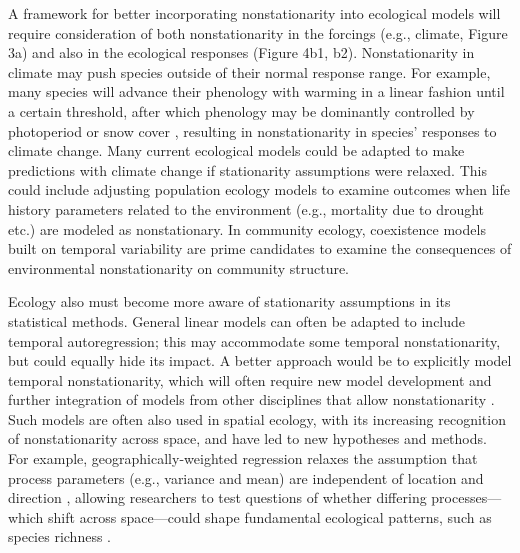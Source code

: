 \documentclass[11pt,a4paper,oneside]{article}
\begin{document}
A framework for better incorporating nonstationarity into ecological models will require consideration of both nonstationarity in the forcings (e.g., climate, Figure 3a) and also in the ecological responses (Figure 4b1, b2). Nonstationarity in climate may push species outside of their normal response range. For example, many species will advance their phenology with warming in a linear fashion until a certain threshold, after which phenology may be dominantly controlled by photoperiod or snow cover \citep{Iler2013}, resulting in nonstationarity in species' responses to climate change. Many current ecological models could be adapted to make predictions with climate change if stationarity assumptions were relaxed. This could include adjusting population ecology models to examine outcomes when life history parameters related to the environment (e.g., mortality due to drought etc.) are modeled as nonstationary. In community ecology, coexistence models built on temporal variability \citep[e.g.,][]{Chesson:1997dz} are prime candidates to examine the consequences of environmental nonstationarity on community structure. 

Ecology also must become more aware of stationarity assumptions in its statistical methods. General linear models can often be adapted to include temporal autoregression; this may accommodate some temporal nonstationarity, but could equally hide its impact. A better approach would be to explicitly model temporal nonstationarity, which will often require new model development and further integration of models from other disciplines that allow nonstationarity \citep[e.g,][]{Grenfell:2001ox,lipp2002}. Such models are often also used in spatial ecology, with its increasing recognition of nonstationarity across space, and have led to new hypotheses and methods. For example, geographically-weighted regression relaxes the assumption that process parameters (e.g., variance and mean) are independent of location and direction \citep{Brunsdon:1998nx}, allowing researchers to test questions of whether differing processes---which shift across space---could shape fundamental ecological patterns, such as species richness \citep{davies2011}.\\  %
\end{document}
